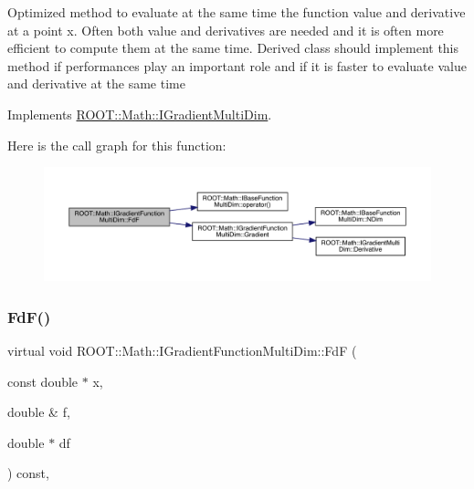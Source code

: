Optimized method to evaluate at the same time the function value and derivative at a point x. Often both value and derivatives are needed and it is often more efficient to compute them at the same time. Derived class should implement this method if performances play an important role and if it is faster to evaluate value and derivative at the same time 

Implements \mbox{\hyperlink{classROOT_1_1Math_1_1IGradientMultiDim_ad8d0e31b786327014524483a708d8f82}{R\+O\+O\+T\+::\+Math\+::\+I\+Gradient\+Multi\+Dim}}.

Here is the call graph for this function\+:
\nopagebreak
\begin{figure}[H]
\begin{center}
\leavevmode
\includegraphics[width=350pt]{da/d1a/classROOT_1_1Math_1_1IGradientFunctionMultiDim_a58cefd2806ec7b9d389911800ed60386_cgraph}
\end{center}
\end{figure}
\mbox{\label{classROOT_1_1Math_1_1IGradientFunctionMultiDim_a58cefd2806ec7b9d389911800ed60386}} 
\subsubsection{\texorpdfstring{FdF()}{FdF()}\hspace{0.1cm}{\footnotesize\ttfamily [3/3]}}
{\footnotesize\ttfamily virtual void R\+O\+O\+T\+::\+Math\+::\+I\+Gradient\+Function\+Multi\+Dim\+::\+FdF (\begin{DoxyParamCaption}\item[{const double $\ast$}]{x,  }\item[{double \&}]{f,  }\item[{double $\ast$}]{df }\end{DoxyParamCaption}) const\hspace{0.3cm}{\ttfamily [inline]}, {\ttfamily [virtual]}}

